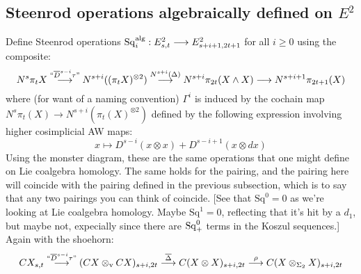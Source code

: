 \documentclass[10pt]{article}
\newcommand{\SqShift}{\Sq_{\smash{+}}}
\newcommand{\Sq}{\mathrm{Sq}}
\begin{document}
\begin{Adams sseq operations}
\subsection{Steenrod operations algebraically defined on $E^2$}
Define Steenrod operations $\Sq^\textup{alg}_i:E^2_{s,t}\to E^2_{s+i+1,2t+1}$ for all $i\geq 0$ using the composite:
\[N^s\pi_tX\overset{\textup{``}\overline{D}^{s-i}\circ\tau\textup{''}}{\to}N^{s+i}((\pi_tX)^{\otimes2})\overset{N^{s+i}(\Delta)}{\to}N^{s+i}\pi_{2t}(X\wedge X)\to N^{s+i+1}\pi_{2t+1}(X)\]
where (for want of a naming convention) $\Gamma^i$ is induced by the cochain map $N^s\pi_t(X)\to N^{s+i}(\pi_t(X)^{\otimes 2})$ defined by the following expression involving higher cosimplicial AW maps:
\[x\mapsto D^{s-i}(x\otimes x)+D^{s-i+1}(x\otimes dx)\]
Using the monster diagram, these are the same operations that one might define on Lie coalgebra homology. The same holds for the pairing, and the pairing here will coincide with the pairing defined in the previous subsection, which is to say that any two pairings you can think of coincide.
[{See that $\Sq^0=0$ as we're looking at Lie coalgebra homology.} Maybe $\Sq^1=0$, reflecting that it's hit by a $d_1$, but maybe not, expecially since there are $\SqShift^0$ terms in the Koszul sequences.]
Again with the shoehorn:
\[CX_{s,t}\overset{\textup{``}\overline{D}^{s-i}\circ\tau\textup{''}}{\to} (CX\otimes_\textup{v}CX)_{s+i,2t} \overset{\overline{\Delta}}{\to}C(X\otimes X)_{s+i,2t}\overset{\rho}{\to}C(X\otimes_{\Sigma_2} X)_{s+i,2t}\]


\end{Adams sseq operations}
\end{document}
